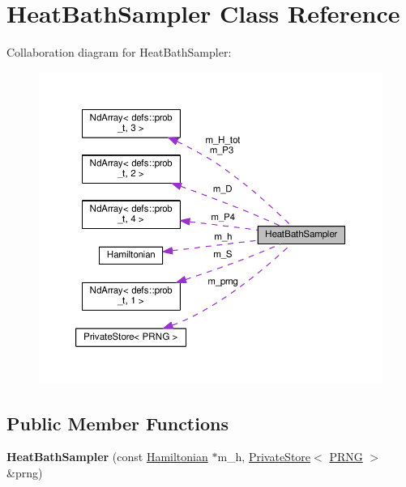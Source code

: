\hypertarget{classHeatBathSampler}{}\section{Heat\+Bath\+Sampler Class Reference}
\label{classHeatBathSampler}


Collaboration diagram for Heat\+Bath\+Sampler\+:
\nopagebreak
\begin{figure}[H]
\begin{center}
\leavevmode
\includegraphics[width=350pt]{classHeatBathSampler__coll__graph}
\end{center}
\end{figure}
\subsection*{Public Member Functions}
\begin{DoxyCompactItemize}
\item 
{\bfseries Heat\+Bath\+Sampler} (const \hyperlink{classHamiltonian}{Hamiltonian} $\ast$m\+\_\+h, \hyperlink{classPrivateStore}{Private\+Store}$<$ \hyperlink{classPRNG}{P\+R\+NG} $>$ \&prng)\hypertarget{classHeatBathSampler_a1451ee391a7bf45458d1200a23cb7ec4}{}\label{classHeatBathSampler_a1451ee391a7bf45458d1200a23cb7ec4}

\end{DoxyCompactItemize}
